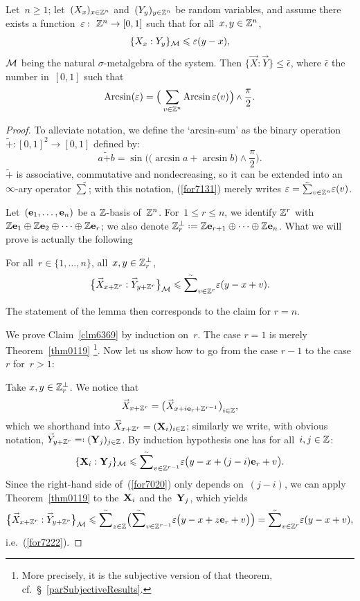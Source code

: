 \begin{Cor}\label{corZnZn}
Let~$n\geq 1$; let~$(X_x)_{x\in\mathbb{Z}^n}$ and~$(Y_y)_{y\in\mathbb{Z}^n}$ be random variables,
and assume there exists a function~$\epsilon \colon \ZZ^n \to [0,1]$
such that for all~$x,y\in\mathbb{Z}^n$,
\[ \{ X_x : Y_y \}_{\mathcal{M}} \leqslant \varepsilon(y-x) ,\]
$\mathcal{M}$ being the natural $\sigma$-metalgebra of the system.
Then $\{\vec{X} : \vec{Y}\} \leq \bar{\epsilon}$,
where $\bar{\epsilon}$ the number in~$[0,1]$ such that
\[\label{for7131} \arcsin (\bar{\epsilon}) =
\Big( \sum_{v\in\ZZ^n} \arcsin \epsilon(v) \Big) \wedge \frac{\pi}{2} .\]
\end{Cor}

\begin{proof}
To alleviate notation, we define the `arcsin-sum'
as the binary operation $\tilde{+} \colon [0,1]^2 \to [0,1]$
defined by:
\[ a \tilde{+} b = \sin \Big( \big( \arcsin a + \arcsin b \big) \wedge \frac{\pi}{2} \Big) .\]
$\tilde{+}$ is associative, commutative and nondecreasing,
so it can be extended into an $\infty$-ary operator $\tilde{\sum}$;
with this notation, (\ref{for7131}) merely writes
$\bar{\epsilon} = \tilde{\sum}_{v\in\ZZ^n} \epsilon(v)$.

Let~$(\mathbf{e}_1,\ldots,\mathbf{e}_n)$ be a $\mathbb{Z}$-basis of~$\mathbb{Z}^n$.
For~$1\leq r\leq n$,
we identify $\mathbb{Z}^r$ with~$\mathbb{Z}\mathbf{e}_1 \oplus \mathbb{Z}\mathbf{e}_2 \oplus \cdots \oplus \mathbb{Z}\mathbf{e}_r$;
we also denote $\ZZ_r^\perp \coloneqq \ZZ\mbf{e}_{r+1} \oplus \cdots \oplus \ZZ\mbf{e}_n$.
What we will prove is actually the following
%
\begin{Clm}\label{clm6369}
For all~$r\in\{1,\ldots,n\}$, all~$x,y\in\mathbb{Z}_r^\perp$,
\[\label{for7222} \big\{ \vec{X}_{x+\ZZ^r} : \vec{Y}_{y+\ZZ^r} \big\}_{\mcal{M}}
\leq \tilde{\sum}_{v\in\ZZ^r} \epsilon(y-x+v) .\]
\end{Clm}%
%
\noindent The statement of the lemma then corresponds to the claim for $r=n$.

We prove Claim~\ref{clm6369} by induction on~$r$.
The case $r=1$ is merely Theorem~\ref{thm0119}%
\footnote{More precisely, it is the subjective version of that theorem,
cf.\ \S~\ref{parSubjectiveResults}.}.
Now let us show how to go from the case $r-1$ to the case $r$ for~$r>1$:

Take $x,y \in \mathbb{Z}_r^\perp$.
We notice that
\[ \vec{X}_{x+\ZZ^r} = \big( \vec{X}_{x+i\mbf{e}_r+\ZZ^{r-1}} \big)_{i\in\ZZ} ,\]
which we shorthand into $\vec{X}_{x+\ZZ^r} = (\mbf{X}_i)_{i\in\ZZ}$;
similarly we write, with obvious notation, $\vec{Y}_{y+\ZZ^r} \eqqcolon (\mbf{Y}_j)_{j\in\ZZ}$.
%
By induction hypothesis one has for all~$i,j\in\mathbb{Z}$:
\[\label{for7020} \{ \mbf{X}_i : \mbf{Y}_j \}_{\mcal{M}} \leq
\tilde{\sum}_{v\in\ZZ^{r-1}} \epsilon\big(y-x+(j-i)\mbf{e}_r+v\big) .\]
Since the right-hand side of~(\ref{for7020}) only depends on~$(j-i)$,
we can apply Theorem~\ref{thm0119}
to the~$\mathbf{X}_i$ and the~$\mathbf{Y}_j$, which yields
\[ \big\{ \vec{X}_{x+\ZZ^r} : \vec{Y}_{y+\ZZ^r} \big\}_{\mcal{M}} \leq
\tilde{\sum}_{z\in\ZZ} \Big( \tilde{\sum}_{v\in\ZZ^{r-1}} \epsilon\big(y-x+z\mbf{e}_r+v \big) \Big)
= \tilde{\sum}_{v\in\ZZ^r} \epsilon(y-x+v) ,\]
i.e.~(\ref{for7222}).
\end{proof}




